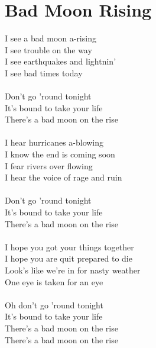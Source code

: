\section{Bad Moon Rising}
I see a bad moon a-rising\\
I see trouble on the way\\
I see earthquakes and lightnin'\\
I see bad times today\\
\\
Don't go 'round tonight\\
It's bound to take your life\\
There's a bad moon on the rise\\
\\
I hear hurricanes a-blowing\\
I know the end is coming soon\\
I fear rivers over flowing\\
I hear the voice of rage and ruin\\
\\
Don't go 'round tonight\\
It's bound to take your life\\
There's a bad moon on the rise\\
\\
I hope you got your things together\\
I hope you are quit prepared to die\\
Look's like we're in for nasty weather\\
One eye is taken for an eye\\
\\
Oh don't go 'round tonight\\
It's bound to take your life\\
There's a bad moon on the rise\\
There's a bad moon on the rise\\